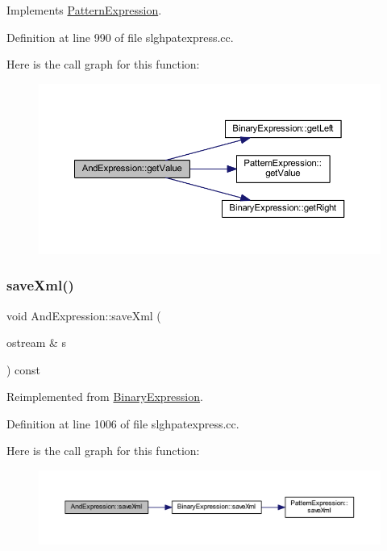 Implements \mbox{\hyperlink{class_pattern_expression_a8332c6ea4c5a7e9dfc690df2a6458bb8}{Pattern\+Expression}}.



Definition at line 990 of file slghpatexpress.\+cc.

Here is the call graph for this function\+:
\nopagebreak
\begin{figure}[H]
\begin{center}
\leavevmode
\includegraphics[width=350pt]{class_and_expression_aaf0fb77253a034fac726186fd0f64cad_cgraph}
\end{center}
\end{figure}
\mbox{\label{class_and_expression_a5e1acc349ab902895d71b6650193e3e3}} 
\subsubsection{\texorpdfstring{saveXml()}{saveXml()}}
{\footnotesize\ttfamily void And\+Expression\+::save\+Xml (\begin{DoxyParamCaption}\item[{ostream \&}]{s }\end{DoxyParamCaption}) const\hspace{0.3cm}{\ttfamily [virtual]}}



Reimplemented from \mbox{\hyperlink{class_binary_expression_a4b9e768a619b713d6c1ff35a618d98ec}{Binary\+Expression}}.



Definition at line 1006 of file slghpatexpress.\+cc.

Here is the call graph for this function\+:
\nopagebreak
\begin{figure}[H]
\begin{center}
\leavevmode
\includegraphics[width=350pt]{class_and_expression_a5e1acc349ab902895d71b6650193e3e3_cgraph}
\end{center}
\end{figure}


